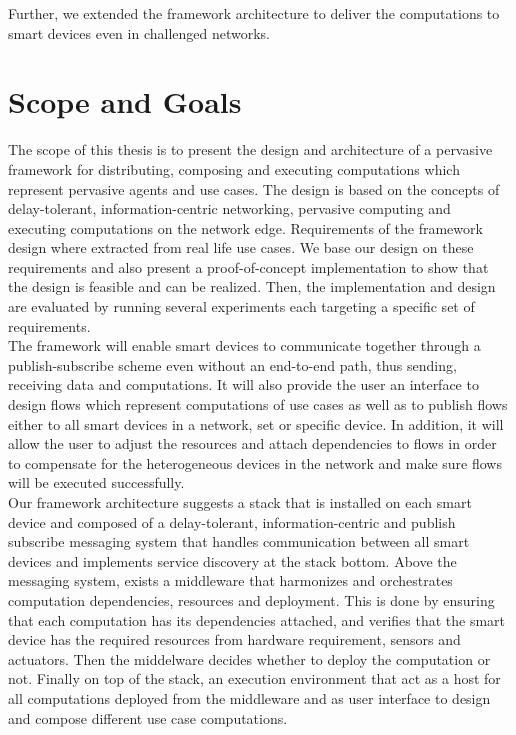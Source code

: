 Further, we extended the framework architecture to deliver the computations to smart devices even in challenged networks. 
 
 
\section{Scope and Goals}
The scope of this thesis is to present the design and architecture of a pervasive  framework for distributing, composing and executing computations which represent pervasive agents and use cases. The design is based on the concepts of delay-tolerant, information-centric networking, pervasive computing and executing computations on the network edge. Requirements of the framework design where extracted from real life use cases. We base our design on these requirements and also present a proof-of-concept implementation to show that the design is feasible and can be realized. Then, the implementation and design are evaluated by running several experiments each targeting a specific set of requirements.\\
	

\noindent The framework will enable smart devices to communicate together through a publish-subscribe scheme even without an end-to-end path, thus sending, receiving data and computations.  It will also provide the user  an interface to design flows which represent computations of use cases as well as to publish flows either to all smart devices in a network, set or specific device. In addition, it will allow the user to adjust the resources and attach dependencies to flows in order to compensate for the heterogeneous devices in the network and make sure flows will be executed successfully.\\

\noindent Our framework architecture  suggests a stack that is installed on each smart device and composed of a delay-tolerant, information-centric and publish subscribe messaging system that handles communication between all smart devices and implements service discovery at the stack bottom. Above the messaging system, exists a middleware that harmonizes and orchestrates computation dependencies, resources and deployment. This is done by ensuring that each computation has its dependencies attached, and verifies that the smart device has the required resources from hardware requirement, sensors and actuators.  Then the middelware decides whether to deploy the computation or not. Finally on top of the stack, an execution environment that act as a host for all computations deployed from the middleware and as user interface to design and compose different use case computations.

